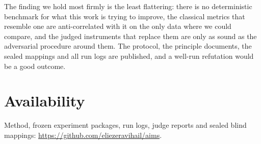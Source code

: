 \documentclass[11pt]{article}
\begin{document}
The finding we hold most firmly is the least flattering: there is no deterministic benchmark for what this work is trying to improve, the classical metrics that resemble one are anti-correlated with it on the only data where we could compare, and the judged instruments that replace them are only as sound as the adversarial procedure around them. The protocol, the principle documents, the sealed mappings and all run logs are published, and a well-run refutation would be a good outcome.

\section*{Availability}
Method, frozen experiment packages, run logs, judge reports and sealed blind mappings: \url{https://github.com/eliezeravihail/aims}.
\end{document}
